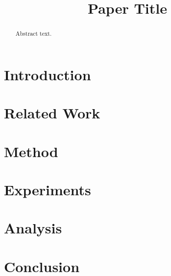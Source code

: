 \documentclass[sigconf,anonymous,review]{acmart}
\title{Paper Title}
\author{}
\date{}
\begin{document}
\maketitle

\begin{abstract}
Abstract text.
\end{abstract}

\section{Introduction}

\section{Related Work}

\section{Method}

\section{Experiments}

\section{Analysis}

\section{Conclusion}



\end{document}
